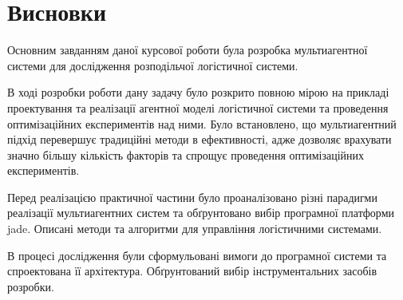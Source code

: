 \section*{Висновки}
Основним завданням даної курсової роботи була розробка  мультиагентної системи для дослідження розподільчої логістичної системи.

В ході розробки роботи дану задачу було розкрито повною мірою на прикладі проектування та реалізації агентної моделі логістичної системи та проведення оптимізаційних експериментів над ними. 
Було встановлено, що мультиагентний підхід перевершує традиційні методи в ефективності, адже дозволяє врахувати значно більшу кількість факторів та спрощує проведення оптимізаційних експериментів.

Перед реалізацією практичної частини було проаналізовано різні парадигми реалізації мультиагентних систем та обґрунтовано вибір програмної платформи \acrshort{jade}.
Описані методи та алгоритми для управління логістичними системами. 

В процесі дослідження були сформульовані вимоги до програмної системи та спроектована її архітектура. 
Обґрунтований вибір інструментальних засобів розробки.
